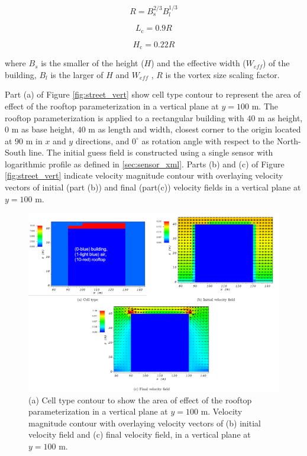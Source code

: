\begin{equation}
R=B_{\mathrm{s}}^{2 / 3} B_{l}^{1 / 3}
\end{equation}

\begin{equation}
L_{\mathrm{c}}=0.9 R
\label{eq:Lc}
\end{equation}

\begin{equation}
H_{\mathrm{c}}=0.22 R
\label{eq:Hc}
\end{equation}

where $B_s$ is the smaller of the height ($H$) and the effective width ($W_{eff}$) of the
building, $B_l$ is the larger of $H$ and $W_{eff}$ , $R$ is the vortex size scaling factor.

Part (a) of Figure \ref{fig:street_vert} show cell type contour to represent the area of effect of the rooftop parameterization in a vertical plane at $y=100$ m. The rooftop parameterization is applied to a rectangular building with $40$ m as height, $0$ m as base height, $40$ m as length and width, closest corner to the origin located at $90$ m in $x$ and $y$ directions, and $0^{\circ}$ as rotation angle with respect to the North-South line. The initial guess field is constructed using a single sensor with logarithmic profile as defined in \ref{sec:sensor_xml}. Parts (b) and (c) of Figure \ref{fig:street_vert} indicate velocity magnitude contour with overlaying velocity vectors of initial (part (b)) and final (part(c)) velocity fields in a vertical plane at $y=100$ m.

\begin{figure}[H]
    \centering
    \includegraphics[width=\textwidth]{Images/rooftop_y_100_1.pdf}
    \caption{(a) Cell type contour to show the area of effect of the rooftop parameterization in a vertical plane at $y=100$ m. Velocity magnitude contour with overlaying velocity vectors of (b) initial velocity field and (c) final velocity field, in a vertical plane at $y=100$ m.}
\end{figure}

